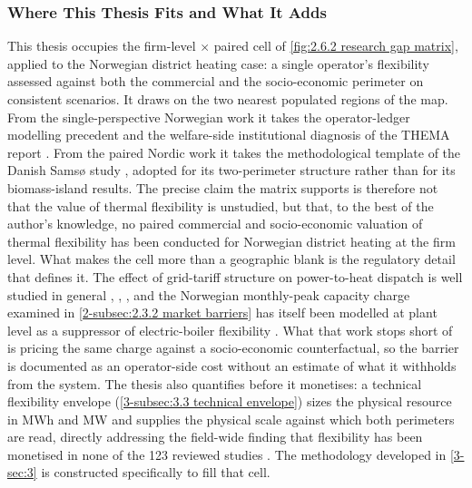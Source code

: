 \subsubsection{Where This Thesis Fits and What It Adds}
\label{2-subsec:2.6.3 where this thesis fits}

This thesis occupies the firm-level $\times$ paired cell of \autoref{fig:2.6.2 research gap matrix}, applied to the Norwegian district heating case: a single operator's flexibility assessed against both the commercial and the socio-economic perimeter on consistent scenarios. It draws on the two nearest populated regions of the map. From the single-perspective Norwegian work it takes the operator-ledger modelling precedent \cite{kirkerud_impacts_2016} and the welfare-side institutional diagnosis of the THEMA report \cite{Thema_fjernvarme_2024}. From the paired Nordic work it takes the methodological template of the Danish Samsø study \cite{ostergaard_business_2019}, adopted for its two-perimeter structure rather than for its biomass-island results. The precise claim the matrix supports is therefore not that the value of thermal flexibility is unstudied, but that, to the best of the author's knowledge, no paired commercial and socio-economic valuation of thermal flexibility has been conducted for Norwegian district heating at the firm level. What makes the cell more than a geographic blank is the regulatory detail that defines it. The effect of grid-tariff structure on power-to-heat dispatch is well studied in general \cite{bergaentzle_cross-sector_2022}, \cite{johannsen_incentivising_2021}, \cite{sandberg_energy_2019}, and the Norwegian monthly-peak capacity charge examined in \autoref{2-subsec:2.3.2 market barriers} has itself been modelled at plant level as a suppressor of electric-boiler flexibility \cite{kirkerud_impacts_2016}. What that work stops short of is pricing the same charge against a socio-economic counterfactual, so the barrier is documented as an operator-side cost without an estimate of what it withholds from the system. The thesis also quantifies before it monetises: a technical flexibility envelope (\autoref{3-subsec:3.3 technical envelope}) sizes the physical resource in MWh and MW and supplies the physical scale against which both perimeters are read, directly addressing the field-wide finding that flexibility has been monetised in none of the 123 reviewed studies \cite{ahmed_district_2025}. The methodology developed in \autoref{3-sec:3} is constructed specifically to fill that cell.


